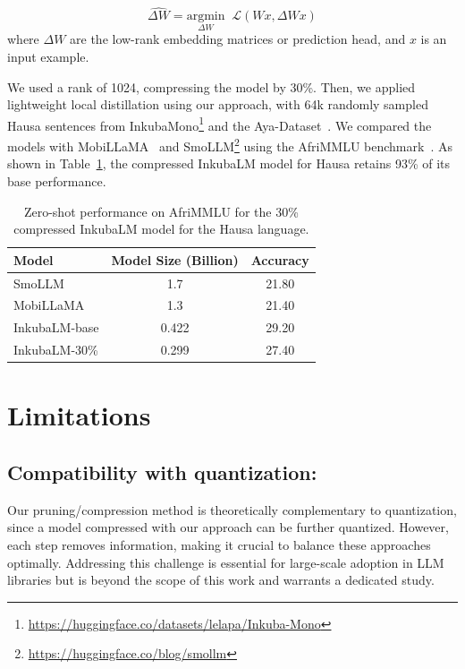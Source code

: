 \[
\widehat{\Delta W} = \underset{{\Delta W}}{\mathrm{argmin}} \;\; \mathcal{L}(Wx, \Delta Wx)
\]
where $\Delta W$ are the low-rank embedding matrices or prediction head, and $x$ is an input example.

We used a rank of 1024, compressing the model by 30\%. Then, we applied lightweight local distillation using our approach, with 64k randomly sampled Hausa sentences from InkubaMono\footnote{\url{https://huggingface.co/datasets/lelapa/Inkuba-Mono}} and the Aya-Dataset~\citep{singh2024aya}. We compared the models with MobiLLaMA~\citep{thawakar2024mobillama} and SmoLLM\footnote{\url{https://huggingface.co/blog/smollm}} using the AfriMMLU benchmark~\citep{afrimmlu}. As shown in Table~\ref{tab:inkuba-ch2}, the compressed InkubaLM model for Hausa retains 93\% of its base performance.

\begin{table}[h!]
    \centering
    {\small{
    \begin{tabular}{lcc}
    \toprule
    \textbf{Model} & \textbf{Model Size (Billion)} & \textbf{Accuracy} \\
    \midrule
    SmoLLM & 1.7 & 21.80 \\
    MobiLLaMA & 1.3 & 21.40 \\
    \midrule
    InkubaLM-base & 0.422 & 29.20 \\
    InkubaLM-30\% & 0.299 & 27.40 \\
    \bottomrule
    \end{tabular}
    }}
    \caption{Zero-shot performance on AfriMMLU for the 30\% compressed InkubaLM model for the Hausa language.}
    \label{tab:inkuba-ch2}
\end{table}

\section{Limitations}

\subsection{Compatibility with quantization:}
Our pruning/compression method is theoretically complementary to quantization, since a model compressed with our approach can be further quantized. However, each step removes information, making it crucial to balance these approaches optimally. Addressing this challenge is essential for large-scale adoption in LLM libraries but is beyond the scope of this work and warrants a dedicated study.

